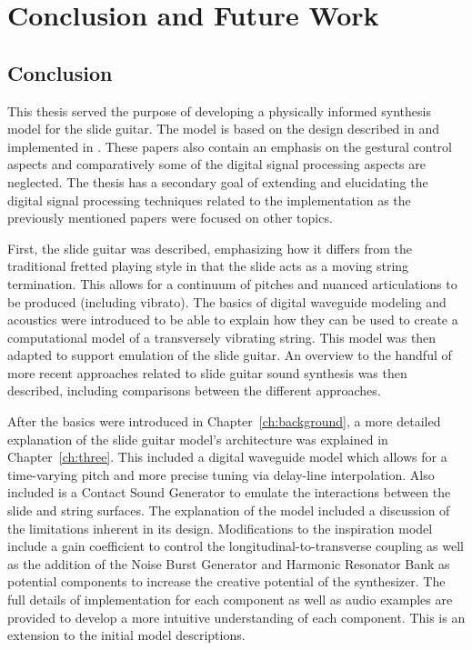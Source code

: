 \documentclass[../main.tex]{subfiles}
\begin{document}
\chapter{Conclusion and Future Work}

\section{Conclusion}
This thesis served the purpose of developing a physically informed synthesis model for the slide guitar. The model is based on the design described in  and implemented in . These papers also contain an emphasis on the gestural control aspects and comparatively some of the digital signal processing aspects are neglected.  The thesis has a secondary goal of extending and elucidating the digital signal processing techniques related to the implementation as the previously mentioned papers were focused on other topics.

First, the slide guitar was described, emphasizing how it differs from the traditional fretted playing style in that the slide acts as a moving string termination. This allows for a continuum of pitches and nuanced articulations to be produced (including vibrato). The basics of digital waveguide modeling and acoustics were introduced to be able to explain how they can be used to create a computational model of a transversely vibrating string. This model was then adapted to support emulation of the slide guitar. An overview to the handful of more recent approaches related to slide guitar sound synthesis was then described, including comparisons between the different approaches.

After the basics were introduced in Chapter~\ref{ch:background}, a more detailed explanation of the slide guitar model's architecture was explained in Chapter~\ref{ch:three}. This included a digital waveguide model which allows for a time-varying pitch and more precise tuning via delay-line interpolation. Also included is a Contact Sound Generator to emulate the interactions between the slide and string surfaces. The explanation of the model included a discussion of the limitations inherent in its design. Modifications to the inspiration model include a gain coefficient to control the longitudinal-to-transverse coupling as well as the addition of the Noise Burst Generator and Harmonic Resonator Bank as potential components to increase the creative potential of the synthesizer. The full details of implementation for each component as well as audio examples are provided to develop a more intuitive understanding of each component. This is an extension to the initial model descriptions.
\end{document}
